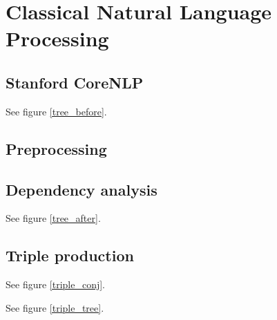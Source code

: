 \chapter{Classical Natural Language Processing}

\section{Stanford CoreNLP}

See figure \ref{tree_before}.


\section{Preprocessing}


\section{Dependency analysis}

See figure \ref{tree_after}.


\section{Triple production}

See figure \ref{triple_conj}.

See figure \ref{triple_tree}.
